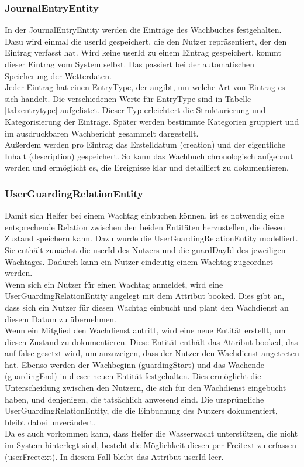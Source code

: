 \documentclass[fontsize=12pt,openright,oneside,paper=a4,BCOR=1cm]{scrbook}
\begin{document}
 \subsubsection{JournalEntryEntity}
In der \glqq JournalEntryEntity\grqq{} werden die Einträge des Wachbuches festgehalten. Dazu wird einmal die \glqq userId\grqq{} gespeichert, die den Nutzer repräsentiert, der den Eintrag verfasst hat. Wird keine \glqq userId\grqq{} zu einem Eintrag gespeichert, kommt dieser Eintrag vom System selbst. Das passiert bei der automatischen Speicherung der Wetterdaten. \\
Jeder Eintrag hat einen \glqq EntryType\grqq{}, der angibt, um welche Art von Eintrag es sich handelt. Die verschiedenen Werte für \glqq EntryType\grqq{} sind in Tabelle \ref{tab:entrytype} aufgelistet. Dieser Typ erleichtert die Strukturierung und Kategorisierung der Einträge. Später werden bestimmte Kategorien gruppiert und im ausdruckbaren Wachbericht gesammelt dargestellt. \\
Außerdem werden pro Eintrag das Erstelldatum (\glqq creation\grqq{}) und der eigentliche Inhalt (\glqq description\grqq{}) gespeichert. So kann das Wachbuch chronologisch aufgebaut werden und ermöglicht es, die Ereignisse klar und detailliert zu dokumentieren.

\subsubsection{UserGuardingRelationEntity}
Damit sich Helfer bei einem Wachtag einbuchen können, ist es notwendig eine entsprechende Relation zwischen den beiden Entitäten herzustellen, die diesen Zustand speichern kann. Dazu wurde die \glqq UserGuardingRelationEntity\grqq{} modelliert. Sie enthält zunächst die \glqq userId\grqq{} des Nutzers und die \glqq guardDayId\grqq{} des jeweiligen Wachtages. Dadurch kann ein Nutzer eindeutig einem Wachtag zugeordnet werden. \\
Wenn sich ein Nutzer für einen Wachtag anmeldet, wird eine \glqq UserGuardingRelationEntity\grqq{} angelegt mit dem Attribut \glqq booked\grqq{}. Dies gibt an, dass sich ein Nutzer für diesen Wachtag einbucht und plant den Wachdienst an diesem Datum zu übernehmen. \\
Wenn ein Mitglied den Wachdienst antritt, wird eine neue Entität erstellt, um diesen Zustand zu dokumentieren. Diese Entität enthält das Attribut \glqq booked\grqq{}, das auf \glqq false\grqq{} gesetzt wird, um anzuzeigen, dass der Nutzer den Wachdienst angetreten hat. Ebenso werden der Wachbeginn (\glqq guardingStart\grqq{}) und das Wachende (\glqq guardingEnd\grqq{}) in dieser neuen Entität festgehalten. Dies ermöglicht die Unterscheidung zwischen den Nutzern, die sich für den Wachdienst eingebucht haben, und denjenigen, die tatsächlich anwesend sind. Die ursprüngliche \glqq UserGuardingRelationEntity\grqq{}, die die Einbuchung des Nutzers dokumentiert, bleibt dabei unverändert.\\
Da es auch vorkommen kann, dass Helfer die Wasserwacht unterstützen, die nicht im System hinterlegt sind, besteht die Möglichkeit diesen per Freitext zu erfassen (\glqq userFreetext\grqq{}). In diesem Fall bleibt das Attribut \glqq userId\grqq{} leer. 
\end{document}
